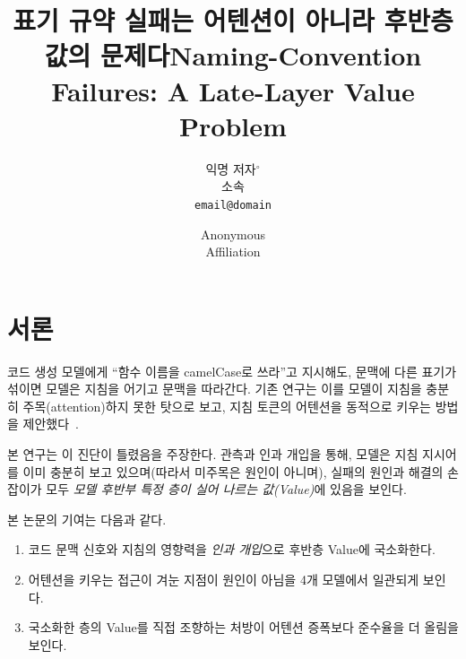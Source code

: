 \documentclass[twocolumn, 10pt]{article}
\title[korean]{표기 규약 실패는 어텐션이 아니라 후반층 값의 문제다}
\title[english]{Naming-Convention Failures: A Late-Layer Value Problem}
\author[korean]{익명 저자$^{\circ}$ \\ 소속 \\ \texttt{email@domain}}{}
\author[english]{Anonymous \\ Affiliation}{}
\begin{document}

\section{서론}
코드 생성 모델에게 ``함수 이름을 camelCase로 쓰라''고 지시해도, 문맥에 다른 표기가
섞이면 모델은 지침을 어기고 문맥을 따라간다. 기존 연구는 이를 모델이 지침을 충분히
주목(attention)하지 못한 탓으로 보고, 지침 토큰의 어텐션을 동적으로 키우는
방법을 제안했다~\cite{venkateswaran:spotlight, zhang:pasta}.

본 연구는 이 진단이 틀렸음을 주장한다. 관측과 인과 개입을 통해, 모델은 지침 지시어를
이미 충분히 보고 있으며(따라서 미주목은 원인이 아니며), 실패의 원인과 해결의 손잡이가
모두 \emph{모델 후반부 특정 층이 실어 나르는 값(Value)}에 있음을 보인다.

본 논문의 기여는 다음과 같다.
\begin{enumerate}
  \item 코드 문맥 신호와 지침의 영향력을 \emph{인과 개입}으로 후반층 Value에 국소화한다.
  \item 어텐션을 키우는 접근이 겨눈 지점이 원인이 아님을 4개 모델에서 일관되게 보인다.
  \item 국소화한 층의 Value를 직접 조향하는 처방이 어텐션 증폭보다 준수율을 더 올림을 보인다.
\end{enumerate}
\end{document}
